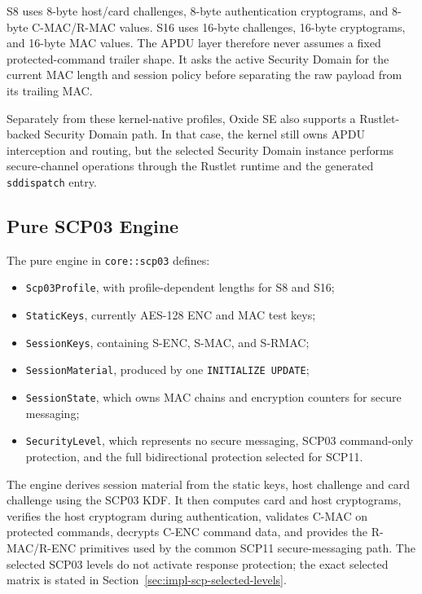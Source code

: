 S8 uses 8-byte host/card challenges, 8-byte authentication cryptograms, and
8-byte C-MAC/R-MAC values. S16 uses 16-byte challenges, 16-byte cryptograms,
and 16-byte MAC values. The APDU layer therefore never assumes a fixed
protected-command trailer shape. It asks the active Security Domain for the
current MAC length and session policy before separating the raw payload from
its trailing MAC.

Separately from these kernel-native profiles, Oxide SE also supports a
Rustlet-backed Security Domain path. In that case, the kernel still owns APDU
interception and routing, but the selected Security Domain instance performs
secure-channel operations through the Rustlet runtime and the generated
\texttt{sddispatch} entry.

\subsection{Pure SCP03 Engine}
\label{sec:impl-scp-core}

The pure engine in \texttt{core::scp03} defines:

\begin{itemize}
\item \texttt{Scp03Profile}, with profile-dependent lengths for S8 and S16;
\item \texttt{StaticKeys}, currently AES-128 ENC and MAC test keys;
\item \texttt{SessionKeys}, containing S-ENC, S-MAC, and S-RMAC;
\item \texttt{SessionMaterial}, produced by one
      \texttt{INITIALIZE UPDATE};
\item \texttt{SessionState}, which owns MAC chains and encryption counters for
      secure messaging;
\item \texttt{SecurityLevel}, which represents no secure messaging, SCP03
      command-only protection, and the full bidirectional protection selected
      for SCP11.
\end{itemize}

The engine derives session material from the static keys, host challenge and
card challenge using the SCP03 KDF. It then computes card and host
cryptograms, verifies the host cryptogram during authentication, validates
C-MAC on protected commands, decrypts C-ENC command data, and provides the
R-MAC/R-ENC primitives used by the common SCP11 secure-messaging path. The
selected SCP03 levels do not activate response protection; the exact selected
matrix is stated in Section~\ref{sec:impl-scp-selected-levels}.

